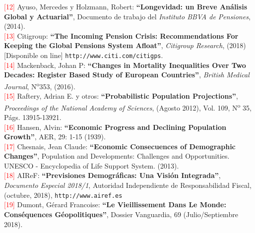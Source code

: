 \vspace{-0.23cm}
\noindent \textcolor{red}{[12]} Ayuso, Mercedes y Holzmann, Robert: \textbf{``Longevidad: un Breve An\'alisis Global y Actuarial''}, Documento de trabajo del \textit{Instituto BBVA de Pensiones}, (2014).\\

\vspace{-0.23cm}
\noindent \textcolor{red}{[13]} Citigroup: \textbf{``The Incoming Pension Crisis: Recommendations For Keeping the Global Pensions System Afloat''}, \textit{Citigroup Research}, (2018) [Disponible on line] \texttt{http://www.citi.com/citigps}.\\

\vspace{-0.23cm}
\noindent \textcolor{red}{[14]} Mackenback, Johan P: \textbf{``Changes in Mortality Inequalities Over Two Decades: Register Based Study of European Countries''}, \textit{British Medical Journal}, N\textsuperscript{o}353, (2016).\\

\vspace{-0.23cm}
\noindent \textcolor{red}{[15]} Raftery, Adrian E. y otros: \textbf{``Probabilistic Population Projections''}, \textit{Proceedings of the National Academy of Sciences}, (Agosto 2012), Vol. 109,  N\textsuperscript{o} 35, P\'ags. 13915-13921.\\

\vspace{-0.23cm}
\noindent \textcolor{red}{[16]} Hansen, Alvin: \textbf{``Economic Progress and Declining Population Growth''}, AER, 29: 1-15 (1939).\\

\vspace{-0.23cm}
\noindent \textcolor{red}{[17]} Chesnais, Jean Claude: \textbf{``Economic Consecuences of Demographic Changes''}, Population and Developments: Challenges and Opportunities. UNESCO - Encyclopedia of Life Support System. (2013).\\

\vspace{-0.23cm}
\noindent \textcolor{red}{[18]} AIReF: \textbf{``Previsiones Demográficas: Una Visión Integrada''}, \textit{Documento Especial 2018/1}, Autoridad Independiente de Responsabilidad Fiscal, (octubre, 2018), \texttt{http://www.airef.es}\\

\vspace{-0.23cm}
\noindent \textcolor{red}{[19]} Dumont, G\'erard Francoise: \textbf{``Le Vieillissement Dans Le Monde: Cons\'equences G\'eopolitiques''}, Dossier Vanguardia, 69  (Julio/Septiembre 2018).\\

